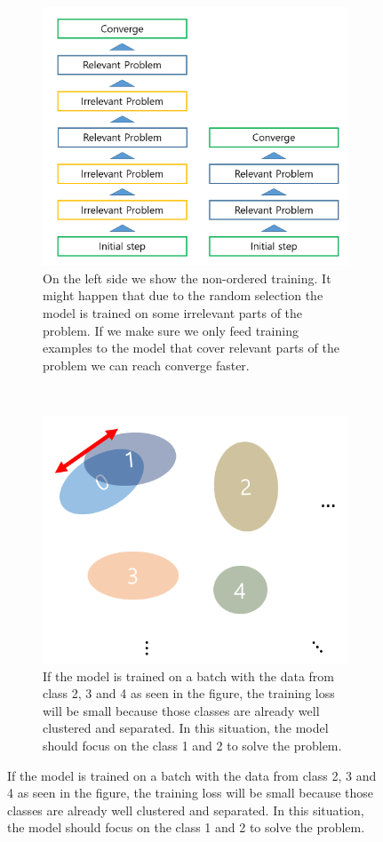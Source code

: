 \begin{figure}
	\centering
	\begin{subfigure}{0.5\textwidth}
		\centering
		\includegraphics[width=1.0\linewidth]{../figures/non_orderd_vs_ordered_learning}
		\caption{On the left side we show the non-ordered training. It might happen that due to the random selection the model is trained on some irrelevant parts of the problem. If we make sure we only feed training examples to the model that cover relevant parts of the problem we can reach converge faster.}
		\label{fig:nonorderdvsorderedlearning}
	\end{subfigure}%
	~
	\begin{subfigure}{0.5\textwidth}
		\centering
		\includegraphics[width=1.0\linewidth]{../figures/optimizing_overlapping_classes}
		\caption{If the model is trained on a batch with the data from class 2, 3 and 4 as seen in the figure, the training loss will be small because those classes are already well clustered and separated. In this situation, the model should focus on the class 1 and 2 to solve the problem.}
		\label{fig:optimizingoverlappingclasses}
	\end{subfigure}
\end{figure}


